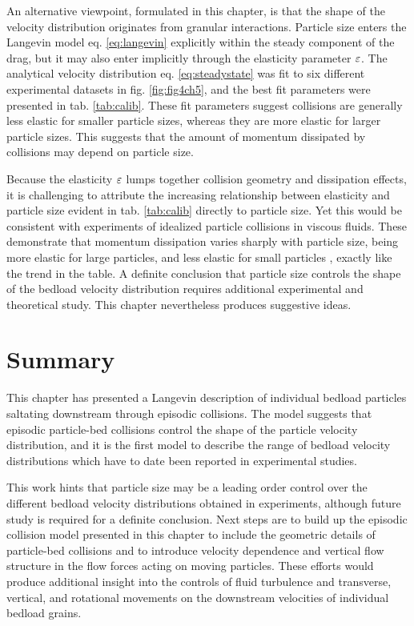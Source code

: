 An alternative viewpoint, formulated in this chapter, is that the shape of the velocity distribution originates from granular interactions.
Particle size enters the Langevin model eq. \ref{eq:langevin} explicitly within the steady component of the drag, but it may also enter implicitly through the elasticity parameter $\varepsilon$.
The analytical velocity distribution eq. \ref{eq:steadystate} was fit to six different experimental datasets in fig. \ref{fig:fig4ch5}, and the best fit parameters were presented in tab. \ref{tab:calib}.
These fit parameters suggest collisions are generally less elastic for smaller particle sizes, whereas they are more elastic for larger particle sizes. This suggests that the amount of momentum dissipated by collisions may depend on particle size.

Because the elasticity $\varepsilon$ lumps together collision geometry and dissipation effects, it is challenging to attribute the increasing relationship between elasticity and particle size evident in tab. \ref{tab:calib} directly to particle size.
Yet this would be consistent with experiments of idealized particle collisions in viscous fluids. These demonstrate that momentum dissipation varies sharply with particle size, being more elastic for large particles, and less elastic for small particles \citep{Joseph2001,Yang2006,Schmeeckle2001}, exactly like the trend in the table.
A definite conclusion that particle size controls the shape of the bedload velocity distribution requires additional experimental and theoretical study. This chapter nevertheless produces suggestive ideas.

\section{Summary}
\label{sec:langconclusion}
This chapter has presented a Langevin description of individual bedload particles saltating downstream through episodic collisions.
The model suggests that episodic particle-bed collisions control the shape of the particle velocity distribution, and it is the first model to describe the range of bedload velocity distributions which have to date been reported in experimental studies.

This work hints that particle size may be a leading order control over the different bedload velocity distributions obtained in experiments, although future study is required for a definite conclusion.
Next steps are to build up the episodic collision model presented in this chapter to include the geometric details of particle-bed collisions and to introduce velocity dependence and vertical flow structure in the flow forces acting on moving particles.
These efforts would produce additional insight into the controls of fluid turbulence and transverse, vertical, and rotational movements on the downstream velocities of individual bedload grains.

